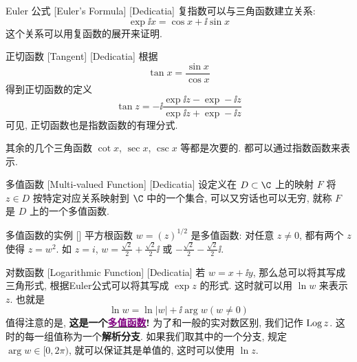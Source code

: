 \documentclass[UTF8]{ctexart}
\newcommand{\hyperrefc}[2]{\hyperref[#1]{\textcolor{purple}{#2}}}
\begin{document}
        \begin{thm}
            [UUID]
            {Euler 公式}
            [Euler's Formula]
            [Dedicatia]
            复指数可以与三角函数建立关系: 
            \[\exp \ii x=\cos x+\ii\sin x\]
            这个关系可以用复函数的\PowerSeries 展开来证明. 
        \end{thm}

        \begin{dfn}
            [UUID]
            {正切函数}
            [Tangent]
            [Dedicatia]
            根据
            \[\tan x=\frac{\sin x}{\cos x}\]
            得到正切函数的定义
            \[\tan z=-\ii\frac{\exp \ii z-\exp -\ii z}{\exp \ii z+\exp -\ii z}\]
            可见, 正切函数也是指数函数的有理分式. 
        \end{dfn}

        其余的几个三角函数 \(\cot x\),  \(\sec x\),  \(\csc x\) 等都是次要的. 都可以通过指数函数来表示. 

        \begin{dfn}
            [Multivalued]
            {多值函数}
            [Multi-valued Function]
            [Dedicatia]
            设定义在 \(D\subset\C\) 上的映射 \(F\) 将 \(z\in D\) 按特定对应关系映射到 \(\C\) 中的一个集合, 可以又穷话也可以无穷, 就称 \(F\) 是 \(D\) 上的一个多值函数. 
        \end{dfn}

        \begin{xmp}
            {多值函数的实例}
            []
            平方根函数 \(w=(z)^{1/2}\) 是多值函数: 对任意 \(z\neq 0\), 都有两个 \(z\) 使得 \(z=w^2\). 如 \(z=i\),  \(w=\frac{\sqrt{2}}{2}+\frac{\sqrt{2}}{2}\ii\) 或 \(-\frac{\sqrt{2}}{2}-\frac{\sqrt{2}}{2}\ii\).
        \end{xmp}

        \begin{dfn}
            [Logarithmic]
            {对数函数}
            [Logarithmic Function]
            [Dedicatia]
            若 \(w=x+\ii y\), 那么总可以将其写成三角形式, 根据Euler公式可以将其写成 \(\exp z\) 的形式. 这时就可以用 \(\ln w\) 来表示 \(z\). 也就是
            \[\ln w=\ln|w|+\ii\arg w (w\neq 0)\]
            值得注意的是, \textbf{这是一个\hyperrefc{dfn:Multivalued}{多值函数}! }为了和一般的实对数区别, 我们记作 \(\operatorname{Log} z\). 这时的每一组值称为一个\textbf{解析分支}. 如果我们取其中的一个分支, 规定 \(\arg w\in[0,2\pi)\), 就可以保证其是单值的, 这时可以使用 \(\ln z\).
        \end{dfn}
\end{document}
